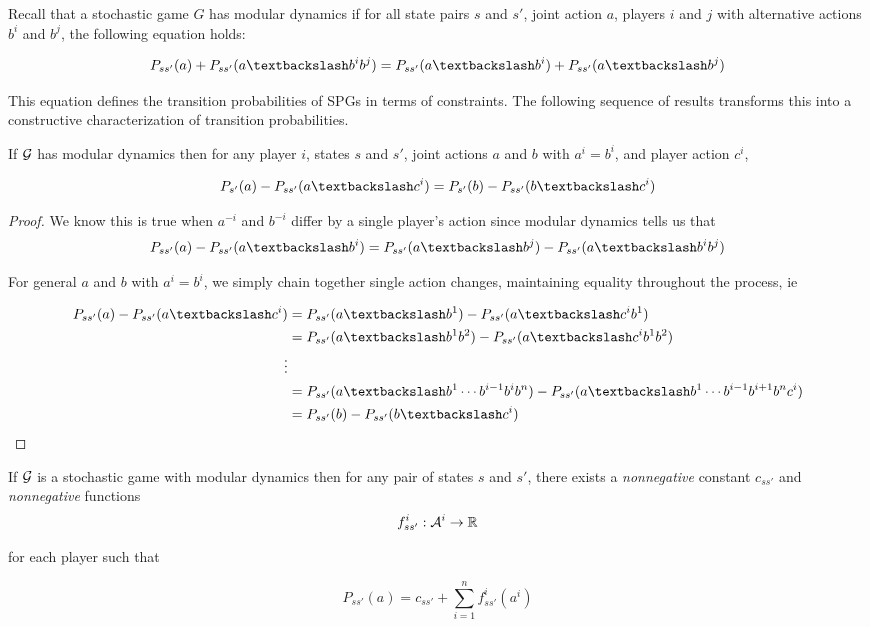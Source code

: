 Recall that a stochastic game $G$ has modular dynamics if for all state pairs $s$ and $s'$, joint action $a$, players $i$ and $j$ with alternative actions $b^i$ and $b^j$, the following equation holds:

\begin{equation}
P_{ss'}(a) + P_{ss'}(\asub{a}{b^ib^j}) = P_{ss'}(\asub{a}{b^i}) + P_{ss'}(\asub{a}{b^j})
\label{eq:modular2}
\end{equation}

This equation defines the transition probabilities of SPGs in terms of constraints. The following sequence of results transforms this into a constructive characterization of transition probabilities.

\begin{proposition}
If $\mathcal{G}$ has modular dynamics then for any player $i$, states $s$ and $s'$,  joint actions $a$ and $b$ with $a^i = b^i$, and player action $c^i$,

$$
P_{s'}(a) - P_{ss'}(\asub{a}{c^i}) = P_{s'}(b) - P_{ss'}(\asub{b}{c^i}) 
$$
\end{proposition}

\begin{proof}
We know this is true when $a^{-i}$ and $b^{-i}$ differ by a single player's action since modular dynamics tells us that
$$
P_{ss'}(a) - P_{ss'}(\asub{a}{b^i}) = P_{ss'}(\asub{a}{b^j}) - P_{ss'}(\asub{a}{b^ib^j})
$$

For general $a$ and $b$ with $a^i = b^i$, we simply chain together single action changes, maintaining equality throughout the process, ie

\begin{align*}
P_{ss'}(a) - P_{ss'}(\asub{a}{c^i}) &= P_{ss'}(\asub{a}{b^1}) - P_{ss'}(\asub{a}{c^ib^1}) \\
&= P_{ss'}(\asub{a}{b^1b^2}) - P_{ss'}(\asub{a}{c^ib^1b^2}) \\
\vdots \\
&= P_{ss'}(\asub{a}{b^1\cdots b^{i-1}b^i b^n}) - P_{ss'}(\asub{a}{b^1\cdots b^{i-1}b^{i+1} b^nc^i}) \\
&= P_{ss'}(b) - P_{ss'}(\asub{b}{c^i})
\end{align*}
\end{proof}

\begin{lem}
If $\mathcal{G}$ is a stochastic game with modular dynamics then for any pair of states $s$ and $s'$, there exists a {\em nonnegative} constant $c_{ss'}$ and {\em nonnegative} functions
$$
f^i_{ss'} : \mathcal{A}^i \rightarrow \mathbb{R}
$$

for each player such that

$$
P_{ss'}(a) = c_{ss'} + \sum_{i=1}^n f^i_{ss'}(a^i)
$$
\end{lem}

